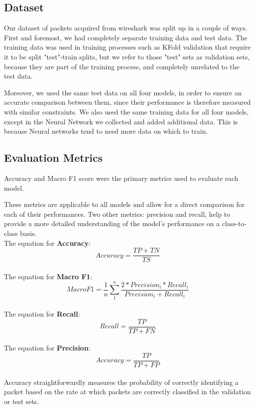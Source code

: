 \documentclass[10pt,sigconf,letterpaper,nonacm]{acmart}
\begin{document}
\subsection{Dataset}
Our dataset of packets acquired from wireshark was split up in a couple of ways. First and foremost, we had completely separate training data and test data. The training data was used in training processes such as KFold validation that require it to be split "test"-train splits, but we refer to those "test" sets as validation sets, because they are part of the training process, and completely unrelated to the test data.

Moreover, we used the same test data on all four models, in order to ensure an accurate comparison between them, since their performance is therefore measured with similar constraints.
We also used the same training data for all four models, except in the Neural Network we collected and added additional data. This is because Neural networks tend to need more data on which to train.

\subsection{Evaluation Metrics}
Accuracy and Macro F1 score were the primary metrics used to evaluate each model. 

These metrics are applicable to all models and allow for
a direct comparison for each of their performances. Two other metrics: precision and recall, help to provide a more detailed understanding of the model's performance on a class-to-class basis.
\newline \\
The equation for \textbf{Accuracy}: \\
\[
Accuracy= \frac{TP + TN}{TS}
\]
\newline \\
The equation for \textbf{Macro F1}: \\
\[
Macro F 1= \frac{1}{n} \sum_{1}^{n} \frac{2*Precision_i*Recall_i}{Precision_i+Recall_i}
\]
\newline \\
The equation for \textbf{Recall}: \\
\[
Recall= \frac{TP}{TP + FN}
\]
\newline \\
The equation for \textbf{Precision}: \\
\[
Accuracy= \frac{TP}{TP + FP}
\]
\\
Accuracy straightforwardly measures the probability of correctly identifying a packet based on the rate at which packets are correctly classified in the validation or test sets.
\end{document}

